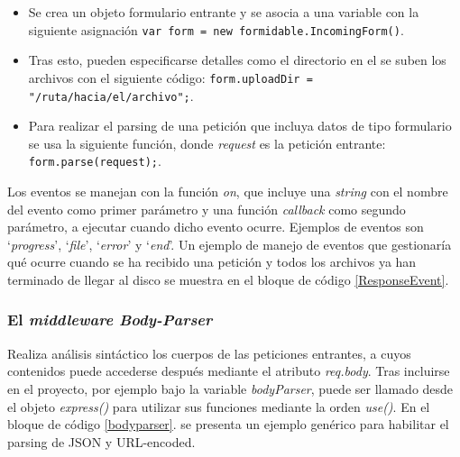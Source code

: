 \begin{itemize}
\item Se crea un objeto formulario entrante y se asocia a una variable con la siguiente asignación \verb+var form = new formidable.IncomingForm()+. 
\item Tras esto, pueden especificarse detalles como el directorio en el se suben los archivos con el siguiente código:  \verb+form.uploadDir = "/ruta/hacia/el/archivo";+. 
\item Para realizar el parsing de una petición que incluya datos de tipo formulario se usa la siguiente función, donde \emph{request} es la petición entrante: \verb+form.parse(request);+.
\end{itemize}

Los eventos se manejan con la función \emph{on}, que incluye una \emph{string} con el nombre del evento como primer parámetro y una función \emph{callback} como segundo parámetro, a ejecutar cuando dicho evento ocurre. Ejemplos de eventos son ‘\emph{progress}’, ‘\emph{file}’, ‘\emph{error}’ y ‘\emph{end}’. Un ejemplo de manejo de eventos que gestionaría qué ocurre cuando se ha recibido una petición y todos los archivos ya han terminado de llegar al disco se muestra en el bloque de código \ref{ResponseEvent}.


\subsubsection{El \emph{middleware Body-Parser}}
Realiza análisis sintáctico los cuerpos de las peticiones entrantes, a cuyos contenidos puede accederse después mediante el atributo \emph{req.body}.
Tras incluirse en el proyecto, por ejemplo bajo la variable \emph{bodyParser}, puede ser llamado desde el objeto \emph{express()} para utilizar sus funciones mediante la orden \emph{use()}. En el bloque de código \ref{bodyparser}. se presenta un ejemplo genérico para habilitar el parsing de JSON y URL-encoded.

